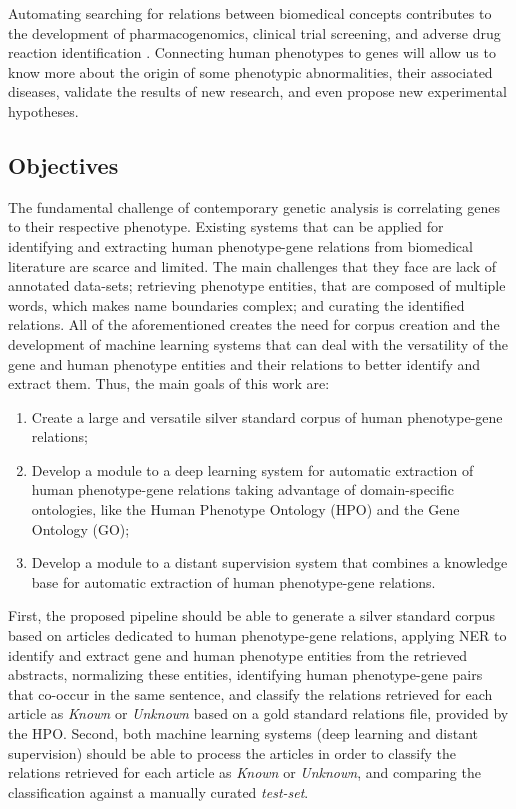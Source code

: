 \documentclass[11pt]{article}
\begin{document}
Automating searching for relations between biomedical concepts contributes to the development of pharmacogenomics, clinical trial screening, and adverse drug reaction identification \cite{doi:10.1093/bib/bbw001}. Connecting human phenotypes to genes will allow us to know more about the origin of some phenotypic abnormalities, their associated diseases, validate the results of new research, and even propose new experimental hypotheses. 


\subsection{Objectives}

The fundamental challenge of contemporary genetic analysis is correlating genes to their respective phenotype. Existing systems that can be applied for identifying and extracting human phenotype-gene relations from biomedical literature are scarce and limited. The main challenges that they face are lack of annotated data-sets; retrieving phenotype entities, that are composed of multiple words, which makes name boundaries complex; and curating the identified relations. All of the aforementioned creates the need for corpus creation and the development of machine learning systems that can deal with the versatility of the gene and human phenotype entities and their relations to better identify and extract them. Thus, the main goals of this work are:

\begin{enumerate}

\item{Create a large and versatile silver standard corpus of human phenotype-gene relations;}

\item{Develop a module to a deep learning system for automatic extraction of human phenotype-gene relations taking advantage of domain-specific ontologies, like the Human Phenotype Ontology (HPO) and the Gene Ontology (GO);}

\item{Develop a module to a distant supervision system that combines a knowledge base for automatic extraction of  human phenotype-gene relations.}
\end{enumerate}

First, the proposed pipeline should be able to generate a silver standard corpus based on articles dedicated to human phenotype-gene relations, applying NER to identify and extract gene and human phenotype entities from the retrieved abstracts, normalizing these entities, identifying human phenotype-gene pairs that co-occur in the same sentence, and classify the relations retrieved for each article as \textit{Known} or \textit{Unknown} based on a gold standard relations file, provided by the HPO. Second, both machine learning systems (deep learning and distant supervision) should be able to process the articles in order to classify the relations retrieved for each article as \textit{Known} or \textit{Unknown}, and comparing the classification against a manually curated \textit{test-set}.
\end{document}
